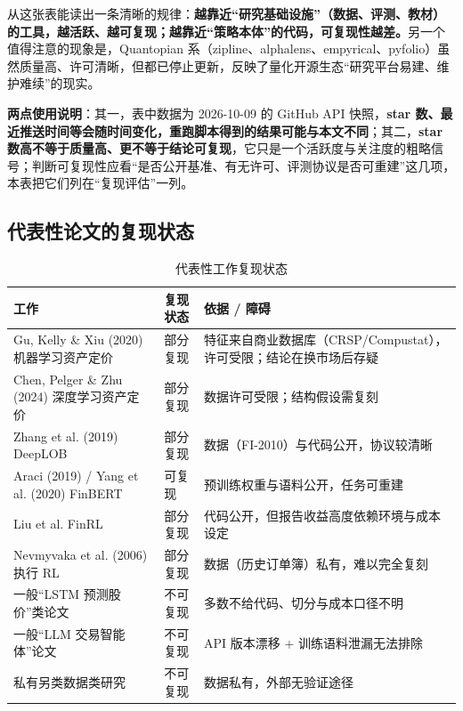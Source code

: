 \noindent 从这张表能读出一条清晰的规律：\textbf{越靠近“研究基础设施”（数据、评测、教材）的工具，越活跃、越可复现；越靠近“策略本体”的代码，可复现性越差。}另一个值得注意的现象是，Quantopian 系（zipline、alphalens、empyrical、pyfolio）虽然质量高、许可清晰，但都已停止更新，反映了量化开源生态“研究平台易建、维护难续”的现实。

\noindent\textbf{两点使用说明}：其一，表中数据为 2026-10-09 的 GitHub API 快照，\textbf{star 数、最近推送时间等会随时间变化，重跑脚本得到的结果可能与本文不同}；其二，\textbf{star 数高不等于质量高、更不等于结论可复现}，它只是一个活跃度与关注度的粗略信号；判断可复现性应看“是否公开基准、有无许可、评测协议是否可重建”这几项，本表把它们列在“复现评估”一列。

\subsection{代表性论文的复现状态}

\begin{table}[htbp]
\centering
\caption{代表性工作复现状态}
\label{tab:paperrepro}
\begin{tabular}{@{}>{\raggedright\arraybackslash}p{4.6cm}>{\raggedright\arraybackslash}p{3.0cm}>{\raggedright\arraybackslash}p{6.4cm}@{}}
\toprule
工作 & 复现状态 & 依据 / 障碍 \\
\midrule
Gu, Kelly \& Xiu (2020) 机器学习资产定价 & 部分复现 & 特征来自商业数据库（CRSP/Compustat），许可受限；结论在换市场后存疑 \\
Chen, Pelger \& Zhu (2024) 深度学习资产定价 & 部分复现 & 数据许可受限；结构假设需复刻 \\
Zhang et al. (2019) DeepLOB & 部分复现 & 数据（FI-2010）与代码公开，协议较清晰 \\
Araci (2019) / Yang et al. (2020) FinBERT & 可复现 & 预训练权重与语料公开，任务可重建 \\
Liu et al. FinRL & 部分复现 & 代码公开，但报告收益高度依赖环境与成本设定 \\
Nevmyvaka et al. (2006) 执行 RL & 部分复现 & 数据（历史订单簿）私有，难以完全复刻 \\
一般“LSTM 预测股价”类论文 & 不可复现 & 多数不给代码、切分与成本口径不明 \\
一般“LLM 交易智能体”论文 & 不可复现 & API 版本漂移 + 训练语料泄漏无法排除 \\
私有另类数据类研究 & 不可复现 & 数据私有，外部无验证途径 \\
\bottomrule
\end{tabular}
\end{table}

